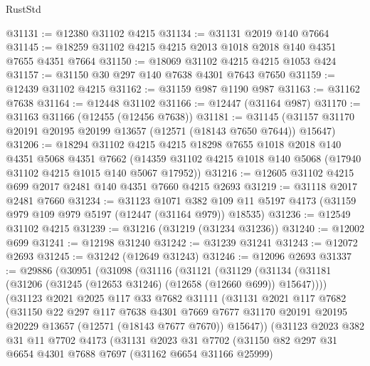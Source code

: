 \begin{lexlean}{RustStd}
\begin{coremodule}
@31131 := @12380 @31102 @4215
@31134 := @31131 @2019 @140 @7664
@31145 := @18259 @31102 @4215 @4215 @2013 @1018 @2018 @140 @4351 @7655 @4351 @7664
@31150 := @18069 @31102 @4215 @4215 @1053 @424
@31157 := @31150 @30 @297 @140 @7638 @4301 @7643 @7650
@31159 := @12439 @31102 @4215
@31162 := @31159 @987 @1190 @987
@31163 := @31162 @7638
@31164 := @12448 @31102
@31166 := @12447 (@31164 @987)
@31170 := @31163 @31166 (@12455 (@12456 @7638))
@31181 := @31145 (@31157 @31170 @20191 @20195 @20199 @13657 (@12571 (@18143 @7650 @7644)) @15647)
@31206 := @18294
    @31102
    @4215
    @4215
    @18298
    @7655
    @1018
    @2018
    @140
    @4351
    @5068
    @4351
    @7662
    (@14359 @31102 @4215 @1018 @140 @5068 (@17940 @31102 @4215 @1015 @140 @5067 @17952))
@31216 := @12605 @31102 @4215 @699 @2017 @2481 @140 @4351 @7660 @4215 @2693
@31219 := @31118 @2017 @2481 @7660
@31234 := @31123
    @1071
    @382
    @109
    @11
    @5197
    @4173
    (@31159 @979 @109 @979 @5197 (@12447 (@31164 @979)) @18535)
@31236 := @12549 @31102 @4215
@31239 := @31216 (@31219 (@31234 @31236))
@31240 := @12002 @699
@31241 := @12198 @31240
@31242 := @31239 @31241
@31243 := @12072 @2693
@31245 := @31242 (@12649 @31243)
@31246 := @12096 @2693
@31337 := @29886
    (@30951
      (@31098
        (@31116
          (@31121
            (@31129
              (@31134 (@31181 (@31206 (@31245 (@12653 @31246) (@12658 (@12660 @699)) @15647))))
              (@31123
                @2021
                @2025
                @117
                @33
                @7682
                @31111
                (@31131
                  @2021
                  @117
                  @7682
                  (@31150
                    @22
                    @297
                    @117
                    @7638
                    @4301
                    @7669
                    @7677
                    @31170
                    @20191
                    @20195
                    @20229
                    @13657
                    (@12571 (@18143 @7677 @7670))
                    @15647))
                (@31123
                  @2023
                  @382
                  @31
                  @11
                  @7702
                  @4173
                  (@31131
                    @2023
                    @31
                    @7702
                    (@31150
                      @82
                      @297
                      @31
                      @6654
                      @4301
                      @7688
                      @7697
                      (@31162 @6654 @31166 @25999)

\end{coremodule}
\end{lexlean}
